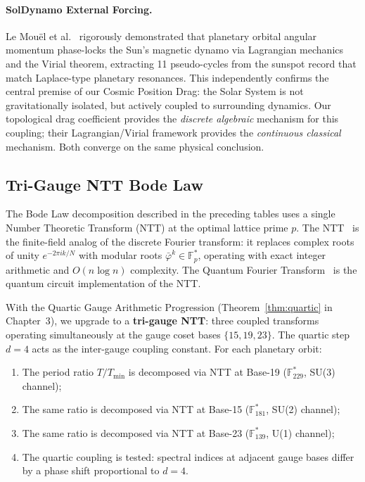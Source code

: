 \paragraph{SolDynamo External Forcing.}
Le Mouël et al.~\cite{lemouël2025} rigorously demonstrated that planetary orbital angular momentum phase-locks the Sun's magnetic dynamo via Lagrangian mechanics and the Virial theorem, extracting 11 pseudo-cycles from the sunspot record that match Laplace-type planetary resonances. This independently confirms the central premise of our Cosmic Position Drag: the Solar System is not gravitationally isolated, but actively coupled to surrounding dynamics. Our topological drag coefficient provides the \emph{discrete algebraic} mechanism for this coupling; their Lagrangian/Virial framework provides the \emph{continuous classical} mechanism. Both converge on the same physical conclusion.

\subsection{Tri-Gauge NTT Bode Law}
The Bode Law decomposition described in the preceding tables uses a single Number Theoretic Transform (NTT) at the optimal lattice prime $p$. The NTT~\cite{pollard1971} is the finite-field analog of the discrete Fourier transform: it replaces complex roots of unity $e^{-2\pi ik/N}$ with modular roots $\bar\varphi^k \in \mathbb{F}_p^*$, operating with exact integer arithmetic and $O(n \log n)$ complexity. The Quantum Fourier Transform~\cite{shor1994} is the quantum circuit implementation of the NTT.

With the Quartic Gauge Arithmetic Progression (Theorem~\ref{thm:quartic} in Chapter~3), we upgrade to a \textbf{tri-gauge NTT}: three coupled transforms operating simultaneously at the gauge coset bases $\{15, 19, 23\}$. The quartic step $d = 4$ acts as the inter-gauge coupling constant. For each planetary orbit:
\begin{enumerate}[noitemsep]
\item The period ratio $T/T_{\min}$ is decomposed via NTT at Base-19 ($\mathbb{F}_{229}^*$, SU(3) channel);
\item The same ratio is decomposed via NTT at Base-15 ($\mathbb{F}_{181}^*$, SU(2) channel);
\item The same ratio is decomposed via NTT at Base-23 ($\mathbb{F}_{139}^*$, U(1) channel);
\item The quartic coupling is tested: spectral indices at adjacent gauge bases differ by a phase shift proportional to $d = 4$.
\end{enumerate}

